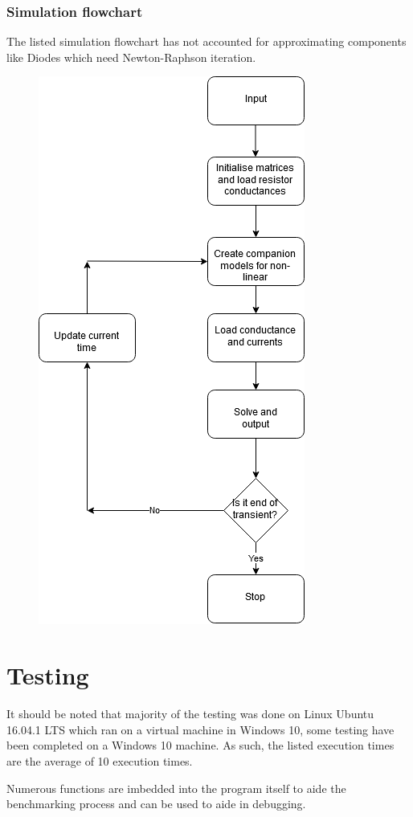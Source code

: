 \documentclass[12pt,a4paper]{article}
\begin{document}
	\subsubsection{Simulation flowchart} 
	The listed simulation flowchart has not accounted for approximating components like Diodes which need Newton-Raphson 
	iteration.
	\begin{figure} [h!]
		\centering
		\includegraphics[scale=0.5]{simulate.PNG} 
	\end{figure} 
\pagebreak

\section{Testing}
It should be noted that majority of the testing was done on Linux Ubuntu 16.04.1 LTS which ran on a virtual machine in Windows 10,
some testing have been completed on a Windows 10 machine. As such, the listed execution times are the average of 10 execution
times. \par 
Numerous functions are imbedded into the program itself to aide the benchmarking process and can be used to aide in debugging.
\pagebreak
\end{document}
